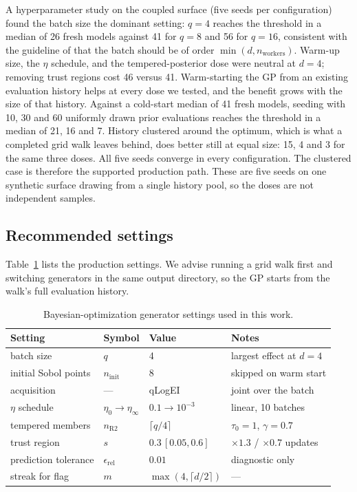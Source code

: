 A hyperparameter study on the coupled surface (five seeds per
configuration) found the batch size the dominant setting: $q = 4$
reaches the threshold in a median of 26 fresh models against 41 for
$q = 8$ and 56 for $q = 16$, consistent with the guideline of
\citet{elgammal2023gpry} that the batch should be of order
$\min(d, n_\mathrm{workers})$. Warm-up size, the $\eta$ schedule, and
the tempered-posterior dose were neutral at $d = 4$; removing trust
regions cost 46 versus 41. Warm-starting the GP from an
existing evaluation history helps at every dose we tested, and the
benefit grows with the size of that history. Against a cold-start median
of 41 fresh models, seeding with 10, 30 and 60 uniformly drawn prior
evaluations reaches the threshold in a median of 21, 16 and 7. History
clustered around the optimum, which is what a completed grid walk leaves
behind, does better still at equal size: 15, 4 and 3 for the same three
doses. All five seeds converge in every configuration. The clustered case
is therefore the supported production path. These are five seeds on one
synthetic surface drawing from a single history pool, so the doses are not
independent samples.

\subsection{Recommended settings}
\label{app:bayesopt:settings}
Table~\ref{tab:bosettings} lists the production settings. We advise
running a grid walk first and switching generators in the same output
directory, so the GP starts from the walk's full evaluation history.

\begin{table}[h]
\centering
\caption{Bayesian-optimization generator settings used in this work.}
\label{tab:bosettings}
\begin{tabular}{llll}
\hline
Setting & Symbol & Value & Notes \\
\hline
batch size & $q$ & 4 & largest effect at $d=4$ \\
initial Sobol points & $n_\mathrm{init}$ & 8 & skipped on warm start \\
acquisition & --- & qLogEI & joint over the batch \\
$\eta$ schedule & $\eta_0 \to \eta_\infty$ & $0.1 \to 10^{-3}$ &
  linear, 10 batches \\
tempered members & $n_\mathrm{R2}$ & $\lceil q/4 \rceil$ &
  $\tau_0 = 1$, $\gamma = 0.7$ \\
trust region & $s$ & $0.3\,[0.05, 0.6]$ & $\times1.3$ / $\times0.7$
  updates \\
prediction tolerance & $\epsilon_\mathrm{rel}$ & $0.01$ &
  diagnostic only \\
streak for flag & $m$ & $\max(4, \lceil d/2 \rceil)$ & --- \\
\hline
\end{tabular}
\end{table}
